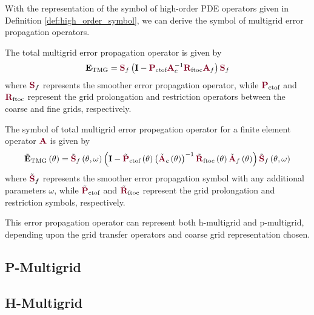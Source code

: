 With the representation of the symbol of high-order PDE operators given in Definition \ref{def:high_order_symbol}, we can derive the symbol of multigrid error propagation operators.

The total multigrid error propagation operator is given by
\begin{equation}
\mathbf{E}_{\text{TMG}} = {\color{burgundy}\mathbf{S}}_f \left( \mathbf{I} - {\color{burgundy}\mathbf{P}}_{\text{ctof}} {\color{burgundy}\mathbf{A}}_c^{-1} {\color{burgundy}\mathbf{R}}_{\text{ftoc}} {\color{burgundy}\mathbf{A}}_f \right) {\color{burgundy}\mathbf{S}}_f
\end{equation}
where ${\color{burgundy}\mathbf{S}}_f$ represents the smoother error propagation operator, while ${\color{burgundy}\mathbf{P}}_{\text{ctof}}$ and ${\color{burgundy}\mathbf{R}}_{\text{ftoc}}$ represent the grid prolongation and restriction operators between the coarse and fine grids, respectively.

\begin{definition}
The symbol of total multigrid error propegation operator for a finite element operator ${\color{burgundy}\mathbf{A}}$ is given by
\begin{equation}
\tilde{\mathbf{E}}_{\text{TMG}} \left( \mathbf{\theta} \right) = \tilde{{\color{burgundy}\mathbf{S}}}_f \left( \mathbf{\theta}, \omega \right) \left( \mathbf{I} - \tilde{{\color{burgundy}\mathbf{P}}}_{\text{ctof}} \left( \mathbf{\theta} \right) \left(\tilde{{\color{burgundy}\mathbf{A}}}_c \left( \mathbf{\theta} \right) \right)^{-1} \tilde{{\color{burgundy}\mathbf{R}}}_{\text{ftoc}} \left( \mathbf{\theta} \right) \tilde{{\color{burgundy}\mathbf{A}}}_f \left( \mathbf{\theta} \right) \right) \tilde{{\color{burgundy}\mathbf{S}}}_f \left( \mathbf{\theta}, \omega \right)
\end{equation}
where $\tilde{{\color{burgundy}\mathbf{S}}}_f$ represents the smoother error propagation symbol with any additional parameters $\omega$, while $\tilde{{\color{burgundy}\mathbf{P}}}_{\text{ctof}}$ and $\tilde{{\color{burgundy}\mathbf{R}}}_{\text{ftoc}}$ represent the grid prolongation and restriction symbols, respectively.
\label{def:multigrid_symbol}
\end{definition}

This error propagation operator can represent both h-multigrid and p-multigrid, depending upon the grid transfer operators and coarse grid representation chosen.

\subsection{P-Multigrid}


\subsection{H-Multigrid}


